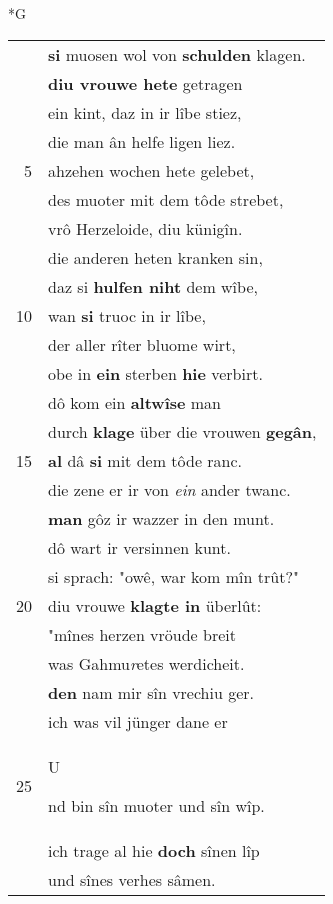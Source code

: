 \documentclass[8pt,a4paper,notitlepage]{article}
\begin{document}
\newpage
\begin{table}[ht]
\begin{minipage}[t]{0.5\linewidth}
\small
\begin{center}*G
\end{center}
\begin{tabular}{rl}
 & \textbf{si} muosen wol von \textbf{schulden} klagen.\\ 
 & \textbf{diu vrouwe hete} getragen\\ 
 & ein kint, daz in ir lîbe stiez,\\ 
 & die man ân helfe ligen liez.\\ 
5 & ahzehen wochen hete gelebet,\\ 
 & des muoter mit dem tôde strebet,\\ 
 & vrô Herzeloide, diu künigîn.\\ 
 & die anderen heten kranken sin,\\ 
 & daz si \textbf{hulfen niht} dem wîbe,\\ 
10 & wan \textbf{si} truoc in ir lîbe,\\ 
 & der aller rîter bluome wirt,\\ 
 & obe in \textbf{ein} sterben \textbf{hie} verbirt.\\ 
 & dô kom ein \textbf{altwîse} man\\ 
 & durch \textbf{klage} über die vrouwen \textbf{gegân},\\ 
15 & \textbf{al} dâ \textbf{si} mit dem tôde ranc.\\ 
 & die zene er ir von \textit{ein} ander twanc.\\ 
 & \textbf{man} gôz ir wazzer in den munt.\\ 
 & dô wart ir versinnen kunt.\\ 
 & si sprach: "owê, war kom mîn trût?"\\ 
20 & diu vrouwe \textbf{klagte in} überlût:\\ 
 & "mînes herzen vröude breit\\ 
 & was Gahmu\textit{r}etes werdicheit.\\ 
 & \textbf{den} nam mir sîn vrechiu ger.\\ 
 & ich was vil jünger dane er\\ 
25 & \begin{large}U\end{large}nd bin sîn muoter und sîn wîp.\\ 
 & ich trage al hie \textbf{doch} sînen lîp\\ 
 & und sînes verhes sâmen.\\ 

\end{tabular}
\end{minipage}
\end{table}
\end{document}

